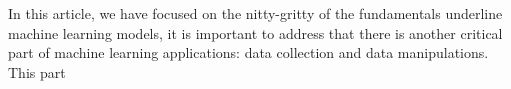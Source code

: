 In this article, we have focused on the nitty-gritty of the fundamentals underline machine learning models, it is important to address that there is another critical part of machine learning applications: data collection and data manipulations. This part  
